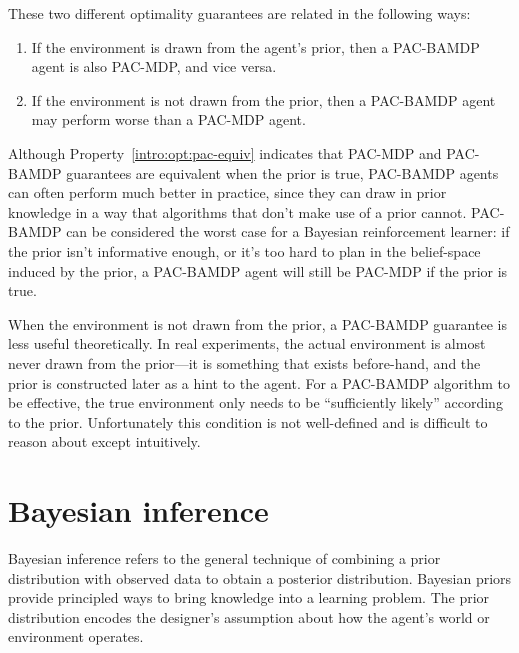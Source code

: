 These two different optimality guarantees are related in the following ways:

\begin{enumerate}
\item If the environment is drawn from the agent's prior, then a PAC-BAMDP agent is also PAC-MDP, and vice versa. \label{intro:opt:pac-equiv} 
\item If the environment is not drawn from the prior, then a PAC-BAMDP agent may perform worse than a PAC-MDP agent. 
\end{enumerate}

Although Property~\ref{intro:opt:pac-equiv} indicates that PAC-MDP and PAC-BAMDP guarantees are equivalent when the prior is true, PAC-BAMDP agents can often perform much better in practice, since they can draw in prior knowledge in a way that algorithms that don't make use of a prior cannot. PAC-BAMDP can be considered the worst case for a Bayesian reinforcement learner: if the prior isn't informative enough, or it's too hard to plan in the belief-space induced by the prior, a PAC-BAMDP agent will still be PAC-MDP if the prior is true.

When the environment is not drawn from the prior, a PAC-BAMDP guarantee is less useful theoretically. In real experiments, the actual environment is almost never drawn from the prior---it is something that exists before-hand, and the prior is constructed later as a hint to the agent. For a PAC-BAMDP algorithm to be effective, the true environment only needs to be ``sufficiently likely'' according to the prior. Unfortunately this condition is not well-defined and is difficult to reason about except intuitively.  

\section{Bayesian inference}

Bayesian inference refers to the general technique of combining a prior distribution with observed data to obtain a posterior distribution. Bayesian priors provide principled ways to bring knowledge into a learning problem. The prior distribution encodes the designer's assumption about how the agent's world or environment operates.


